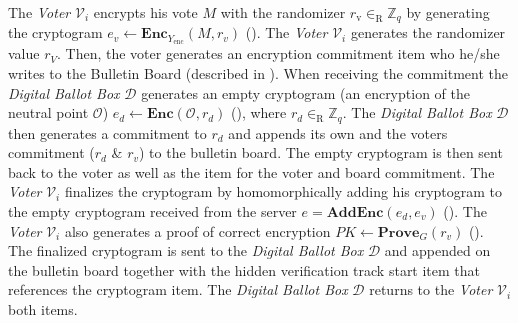 The \textit{Voter} $\mathcal{V}_i$ encrypts his vote $M$ with the randomizer \( r_\mathrm{v} \in_\mathrm{R} \mathbb{Z}_q \) by generating the cryptogram \( e_v \gets \mathbf{Enc}_{Y_\mathrm{enc}} (M, r_v) \) (). The \textit{Voter} $\mathcal{V}_i$ generates the randomizer value $r_V$. Then, the voter generates an encryption commitment item who he/she writes to the Bulletin Board (described in ). When receiving the commitment the \textit{Digital Ballot Box} $\mathcal{D}$ generates an empty cryptogram (an encryption of the neutral point $\mathcal{O}$) \( e_d \gets \mathbf{Enc} (\mathcal{O}, r_d) \) (), where \( r_d \in_\mathrm{R} \mathbb{Z}_q \). The \textit{Digital Ballot Box} $\mathcal{D}$ then generates a commitment to $r_d$ and appends its own and the voters commitment ($r_d$ \& $r_v$) to the bulletin board. The empty cryptogram is then sent back to the voter as well as the item for the voter and board commitment. The \textit{Voter} $\mathcal{V}_i$ finalizes the cryptogram by homomorphically adding his cryptogram to the empty cryptogram received from the server \( e = \mathbf{AddEnc}(e_d, e_v) \) (). The \textit{Voter} $\mathcal{V}_i$ also generates a proof of correct encryption \( PK \gets \mathbf{Prove}_G (r_v) \) (). The finalized cryptogram is sent to the \textit{Digital Ballot Box} $\mathcal{D}$ and appended on the bulletin board together with the hidden verification track start item that references the cryptogram item. The \textit{Digital Ballot Box} $\mathcal{D}$ returns to the \textit{Voter} $\mathcal{V}_i$ both items.




